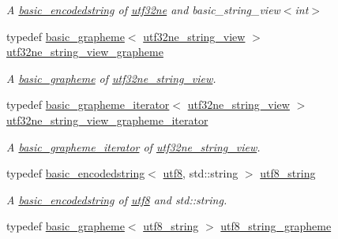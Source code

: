 \begin{DoxyCompactItemize}
\begin{DoxyCompactList}\small\item\em A \hyperlink{classu5e_1_1basic__encodedstring}{basic\+\_\+encodedstring} of \hyperlink{classu5e_1_1utf32ne}{utf32ne} and basic\+\_\+string\+\_\+view$<$int$>$ \end{DoxyCompactList}\item 
typedef \hyperlink{classu5e_1_1basic__grapheme}{basic\+\_\+grapheme}$<$ \hyperlink{classu5e_1_1utf32ne__string__view}{utf32ne\+\_\+string\+\_\+view} $>$ \hyperlink{namespaceu5e_a4f1e65e4fe686226fe42d1b2eca47692}{utf32ne\+\_\+string\+\_\+view\+\_\+grapheme}\hypertarget{namespaceu5e_a4f1e65e4fe686226fe42d1b2eca47692}{}\label{namespaceu5e_a4f1e65e4fe686226fe42d1b2eca47692}

\begin{DoxyCompactList}\small\item\em A \hyperlink{classu5e_1_1basic__grapheme}{basic\+\_\+grapheme} of \hyperlink{classu5e_1_1utf32ne__string__view}{utf32ne\+\_\+string\+\_\+view}. \end{DoxyCompactList}\item 
typedef \hyperlink{classu5e_1_1basic__grapheme__iterator}{basic\+\_\+grapheme\+\_\+iterator}$<$ \hyperlink{classu5e_1_1utf32ne__string__view}{utf32ne\+\_\+string\+\_\+view} $>$ \hyperlink{namespaceu5e_a8bf56226d046da2bbabafc29c5509c27}{utf32ne\+\_\+string\+\_\+view\+\_\+grapheme\+\_\+iterator}\hypertarget{namespaceu5e_a8bf56226d046da2bbabafc29c5509c27}{}\label{namespaceu5e_a8bf56226d046da2bbabafc29c5509c27}

\begin{DoxyCompactList}\small\item\em A \hyperlink{classu5e_1_1basic__grapheme__iterator}{basic\+\_\+grapheme\+\_\+iterator} of \hyperlink{classu5e_1_1utf32ne__string__view}{utf32ne\+\_\+string\+\_\+view}. \end{DoxyCompactList}\item 
typedef \hyperlink{classu5e_1_1basic__encodedstring}{basic\+\_\+encodedstring}$<$ \hyperlink{classu5e_1_1utf8}{utf8}, std\+::string $>$ \hyperlink{namespaceu5e_a3814526c6ea7ca04223a8ec1b662d497}{utf8\+\_\+string}\hypertarget{namespaceu5e_a3814526c6ea7ca04223a8ec1b662d497}{}\label{namespaceu5e_a3814526c6ea7ca04223a8ec1b662d497}

\begin{DoxyCompactList}\small\item\em A \hyperlink{classu5e_1_1basic__encodedstring}{basic\+\_\+encodedstring} of \hyperlink{classu5e_1_1utf8}{utf8} and std\+::string. \end{DoxyCompactList}\item 
typedef \hyperlink{classu5e_1_1basic__grapheme}{basic\+\_\+grapheme}$<$ \hyperlink{classu5e_1_1utf8__string}{utf8\+\_\+string} $>$ \hyperlink{namespaceu5e_a1326ad571e74e2be8a723612b8e29526}{utf8\+\_\+string\+\_\+grapheme}\hypertarget{namespaceu5e_a1326ad571e74e2be8a723612b8e29526}{}\label{namespaceu5e_a1326ad571e74e2be8a723612b8e29526}


\end{DoxyCompactItemize}
